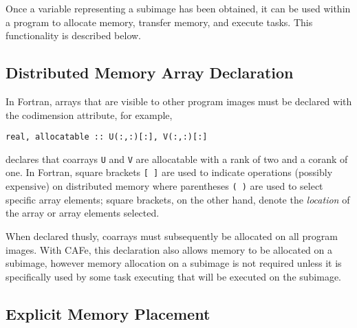 Once a variable representing a subimage has been obtained, it can be used within a program
to allocate memory, transfer memory, and execute tasks.  This functionality is described below.


\subsection{Distributed Memory Array Declaration}

In Fortran, arrays that are visible to other program images must be declared with the
codimension attribute, for example,
\begin{verbatim}
real, allocatable :: U(:,:)[:], V(:,:)[:]
\end{verbatim}
declares that coarrays \texttt{U} and \texttt{V} are allocatable with a rank of two and a
corank of one.  In Fortran, square brackets \texttt{[ ]} are used to indicate operations
(possibly expensive) on distributed memory where parentheses \texttt{( )} are used to
select specific array elements; square brackets, on the other hand, denote the
\emph{location} of the array or array elements selected.

When declared thusly, coarrays must subsequently be allocated on all program images.  With
CAFe, this declaration also allows memory to be allocated on a subimage, however memory
allocation on a subimage is not required unless it is specifically used by some task
executing that will be executed on the subimage.


\subsection{Explicit Memory Placement}

